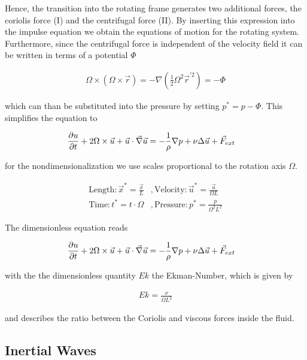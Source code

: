 Hence, the transition into the rotating frame generates two additional forces, the coriolis force (I)  and the centrifugal force (II).
By inserting this expression into the impulse equation we obtain the equations of motion for the rotating system.
Furthermore, since the centrifugal force is independent of the velocity field it can be written in terms of a potential $\Phi$

\begin{align}
    \Omega \times (\Omega \times \vec{r}) = - \nabla(\frac{1}{2}\Omega^2\vec{r}^{'2}) = -\Phi
\end{align}

which  can than be substituted into the pressure by setting $p^* = p - \Phi$.
This simplifies the equation to

\begin{align}
    \pdn[u]{t} + 2\Omega \times \vec{u} +  \vec{u} \cdot \vec{\nabla} \vec{u} &= - \frac{1}{\rho} \nabla p + \nu \Delta \vec{u} + \vec{F}_{ext}
\end{align}

for the nondimensionalization we use scales proportional to the rotation axis $\Omega$.

\begin{align}
    \mathrm{Length}  : \vec{x}^* = \frac{\vec{x}}{L}  &, \mathrm{Velocity}: \vec{u}^* = \frac{\vec{u}}{\Omega L}\\
    \mathrm{Time}    : t^* = t \cdot \Omega      &, \mathrm{Pressure}: p^* = \frac{p}{\Omega^2 L^2}
\end{align}

The dimensionless equation reads

\begin{align}
    \pdn[u]{t} + 2\Omega \times \vec{u} +  \vec{u} \cdot \vec{\nabla} \vec{u} &= - \frac{1}{\rho} \nabla p + \nu \Delta \vec{u} + \vec{F}_{ext}
\end{align}

with the the dimensionless quantity $Ek$ the Ekman-Number, which is given by

\begin{align}
    Ek = \frac{\nu}{\Omega L^2}
\end{align}

and describes the ratio between the Coriolis and viscous forces inside the fluid.

\subsection{Inertial Waves}

